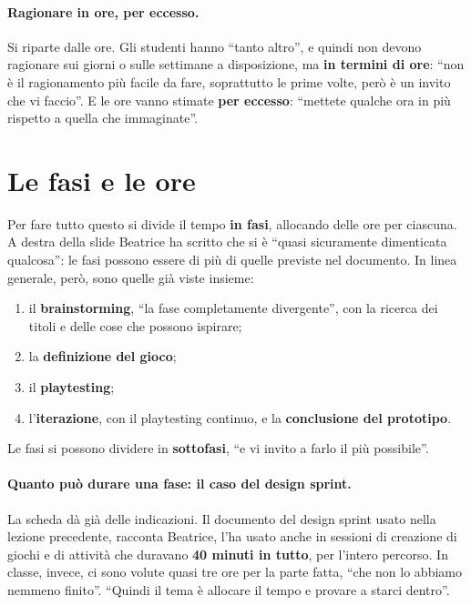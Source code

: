 \paragraph{Ragionare in ore, per eccesso.} Si riparte dalle ore. Gli studenti hanno
``tanto altro'', e quindi non devono ragionare sui giorni o sulle settimane a
disposizione, ma \textbf{in termini di ore}: ``non è il ragionamento più facile da
fare, soprattutto le prime volte, però è un invito che vi faccio''. E le ore vanno
stimate \textbf{per eccesso}: ``mettete qualche ora in più rispetto a quella che
immaginate''.

\section{Le fasi e le ore}
\label{a9:sec:fasi}

Per fare tutto questo si divide il tempo \textbf{in fasi}, allocando delle ore per
ciascuna. A destra della slide Beatrice ha scritto che si è ``quasi sicuramente
dimenticata qualcosa'': le fasi possono essere di più di quelle previste nel
documento. In linea generale, però, sono quelle già viste insieme:
\begin{enumerate}
  \item il \textbf{brainstorming}, ``la fase completamente divergente'', con la
        ricerca dei titoli e delle cose che possono ispirare;
  \item la \textbf{definizione del gioco};
  \item il \textbf{playtesting};
  \item l'\textbf{iterazione}, con il playtesting continuo, e la
        \textbf{conclusione del prototipo}.
\end{enumerate}
Le fasi si possono dividere in \textbf{sottofasi}, ``e vi invito a farlo il più
possibile''.

\paragraph{Quanto può durare una fase: il caso del design sprint.} La scheda dà già
delle indicazioni. Il documento del design sprint usato nella lezione precedente,
racconta Beatrice, l'ha usato anche in sessioni di creazione di giochi e di attività
che duravano \textbf{40 minuti in tutto}, per l'intero percorso. In classe, invece,
ci sono volute quasi tre ore per la parte fatta, ``che non lo abbiamo nemmeno finito''.
``Quindi il tema è allocare il tempo e provare a starci dentro''.

